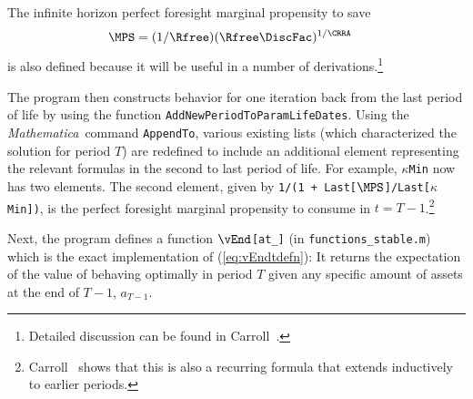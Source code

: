 \documentclass[titlepage, headings=optiontotocandhead]{\econtex}
\newcommand{\Mma}{\textit{Mathematica}}
\begin{document}
The infinite horizon perfect foresight marginal propensity to save 
\begin{equation}\begin{gathered}\begin{aligned}
      \MPS  & = (1/\Rfree)(\Rfree \DiscFac)^{1/\CRRA} \label{eq:lambdadefn}
    \end{aligned}\end{gathered}\end{equation}
is also defined because it will be useful in a number of derivations.\footnote{Detailed discussion can
  be found in Carroll~\citeyearpar{BufferStockTheory}.}

The program then constructs behavior for one iteration back from the
last period of life by using the function
\texttt{AddNewPeriodToParamLifeDates}.  Using the {\Mma}~command
\texttt{AppendTo}, various existing lists (which characterized the
solution for period $T$) are redefined to include an additional
element representing the relevant formulas in the second to last
period of life. For example, \texttt{$\kappa$Min} now has two
elements.  The second element, given by \texttt{1/(1 +
  Last[$\MPS$]/Last[$\kappa$Min])}, is the perfect foresight marginal
propensity to consume in $t=T-1$.\footnote{Carroll~\citeyearpar{BufferStockTheory} shows that this is also a
  recurring formula that extends inductively to earlier periods.}

Next, the program defines a function \texttt{$\vEnd$[at\_]} (in \texttt{functions\_stable.m})
which  is the exact implementation
of (\ref{eq:vEndtdefn}): It returns the expectation of
the value of behaving optimally in period $T$ given any specific
amount of assets at the end of $T-1$, ${a}_{T-1}$.
\end{document}
